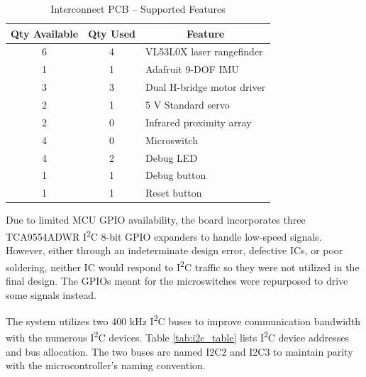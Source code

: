 \begin{table}[h]
	\centering	\caption{Interconnect PCB -- Supported Features}	\label{tab:interconnect_features}
	\begin{tabular}{ccl}
		\toprule 
		Qty Available & Qty Used & \multicolumn{1}{c}{Feature} \\ 
		\midrule 
		6 & 4 & VL53L0X laser rangefinder \\ 
		1 & 1 & Adafruit 9-DOF IMU \\ 
		3 & 3 & Dual H-bridge motor driver \\
		2 & 1 & 5 V Standard servo \\ 
		2 & 0 & Infrared proximity array \\
		4 & 0 & Microswitch \\ 
		4 & 2 & Debug LED \\ 
		1 & 1 & Debug button \\
		1 & 1 & Reset button \\ 
		\bottomrule
	\end{tabular} 
\end{table}

Due to limited MCU GPIO availability, the board incorporates three TCA9554ADWR I\textsuperscript{2}C 8-bit GPIO expanders to handle low-speed signals. However, either through an indeterminate design error, defective ICs, or poor soldering, neither IC would respond to I\textsuperscript{2}C traffic so they were not utilized in the final design. The GPIOs meant for the microswitches were repurposed to drive some signals instead.

The system utilizes two 400 kHz I\textsuperscript{2}C buses to improve communication bandwidth with the numerous I\textsuperscript{2}C devices. Table \ref{tab:i2c_table} lists I\textsuperscript{2}C device addresses and bus allocation. The two buses are named I2C2 and I2C3 to maintain parity with the microcontroller's naming convention.

